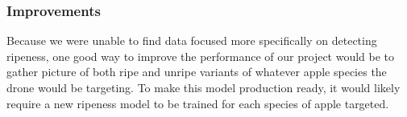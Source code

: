 \subsubsection{Improvements}
Because we were unable to find data focused more specifically on detecting ripeness, 
one good way to improve the performance of our project would be to gather picture of both ripe and unripe variants of whatever apple species the drone would be targeting. 
To make this model production ready, it would likely require a new ripeness model to be trained for each species of apple targeted.

